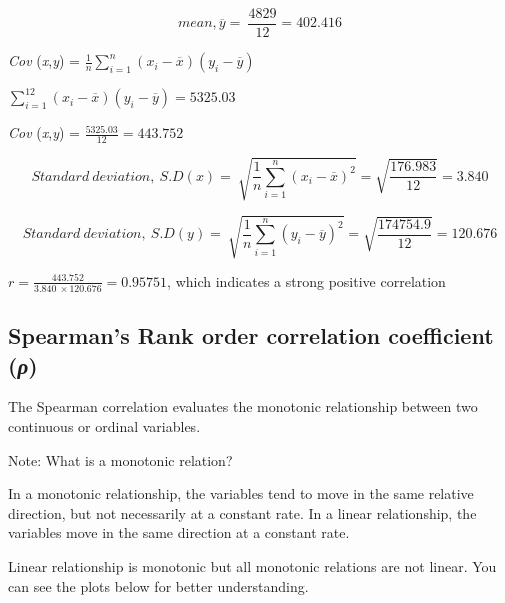 \documentclass[
]{book}
\begin{document}
\[mean,\overline{y} = \ \frac{4829}{12} = 402.416\]

\emph{Cov} (\emph{x},\emph{y}) =
\(\frac{1}{n}\sum_{i = 1}^{n}{\left( x_{i} - \overline{x} \right)\left( y_{i} - \overline{y} \right)}\)

\(\sum_{i = 1}^{12}{\left( x_{i} - \overline{x} \right)\left( y_{i} - \overline{y} \right)} = 5325.03\)

\emph{Cov} (\emph{x},\emph{y}) = \(\frac{5325.03}{12} = 443.752\)

\[Standard\ deviation,\ S.D\left( x \right) = \ \sqrt{\frac{1}{n}\sum_{i = 1}^{n}\left( x_{i} - \overline{x} \right)^{2}} = \sqrt{\frac{176.983}{12}} = 3.840\]

\[Standard\ deviation,\ S.D\left( y \right) = \ \sqrt{\frac{1}{n}\sum_{i = 1}^{n}\left( y_{i} - \overline{y} \right)^{2}} = \sqrt{\frac{174754.9}{12}} = 120.676\]

\(r = \frac{443.752}{3.840\  \times 120.676} = 0.95751\), which indicates
a strong positive correlation

\hypertarget{spearmans-rank-order-correlation-coefficient-ux3c1}{%
\subsection{\texorpdfstring{Spearman's Rank order correlation coefficient (\emph{ρ})}{Spearman's Rank order correlation coefficient (ρ)}}\label{spearmans-rank-order-correlation-coefficient-ux3c1}}

The Spearman correlation evaluates the monotonic relationship between
two continuous or ordinal variables.

Note: What is a monotonic relation?

In a monotonic relationship, the variables tend to move in the same
relative direction, but not necessarily at a constant rate. In a linear
relationship, the variables move in the same direction at a constant
rate.

Linear relationship is monotonic but all monotonic relations are not
linear. You can see the plots below for better understanding.
\end{document}
